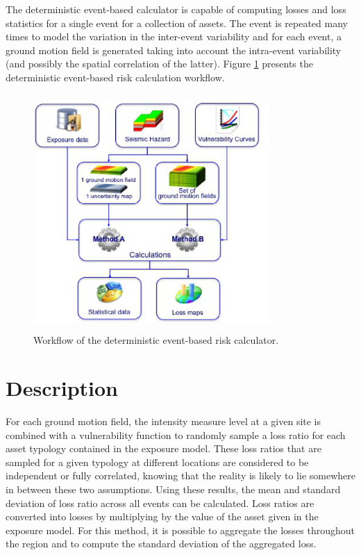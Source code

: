 The deterministic event-based calculator is capable of computing losses and loss statistics for a single event for a collection of assets. The event is repeated many times to model the variation in the inter-event variability and for each event, a ground motion field is generated taking into account the intra-event variability (and possibly the spatial correlation of the latter). Figure \ref{fig:Scheme_deter_calc}  presents the deterministic event-based risk calculation workflow.

\begin{figure}[ht]
\centering
\includegraphics[width=9cm,height=9cm]{./Figures/Part_Risk/Scheme_Deter_calc.eps}
\caption{Workflow of the deterministic event-based risk calculator.}
\label{fig:Scheme_deter_calc}
\end{figure}


\section{Description}
For each ground motion field, the intensity measure level at a given site is combined with a vulnerability function to randomly sample a loss ratio for each asset typology contained in the exposure model. These loss ratios that are sampled for a given typology at different locations are considered to be independent or fully correlated, knowing that the reality is likely to lie somewhere in between these two assumptions. Using these results, the mean and standard deviation of loss ratio across all events can be calculated. Loss ratios are converted into losses by multiplying by the value of the asset given in the exposure model. For this method, it is possible to aggregate the losses throughout the region and to compute the standard deviation of the aggregated loss. 

